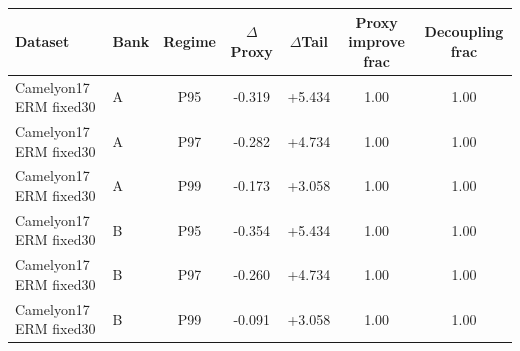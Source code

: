 \begin{tabular}{llccccc}
  \toprule
  Dataset & Bank & Regime & $\Delta$Proxy & $\Delta$Tail & Proxy improve frac & Decoupling frac \\
  \midrule
  Camelyon17 ERM fixed30 & A & P95 & -0.319 & +5.434 & 1.00 & 1.00 \\
  Camelyon17 ERM fixed30 & A & P97 & -0.282 & +4.734 & 1.00 & 1.00 \\
  Camelyon17 ERM fixed30 & A & P99 & -0.173 & +3.058 & 1.00 & 1.00 \\
  Camelyon17 ERM fixed30 & B & P95 & -0.354 & +5.434 & 1.00 & 1.00 \\
  Camelyon17 ERM fixed30 & B & P97 & -0.260 & +4.734 & 1.00 & 1.00 \\
  Camelyon17 ERM fixed30 & B & P99 & -0.091 & +3.058 & 1.00 & 1.00 \\
  \bottomrule
\end{tabular}
